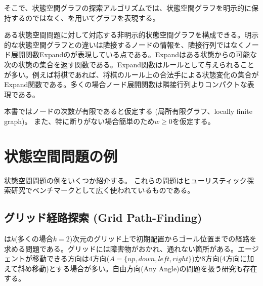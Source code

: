 そこで、状態空間グラフの探索アルゴリズムでは、状態空間グラフを明示的に保持するのではなく、を用いてグラフを表現する。


ある状態空間問題に対して対応する非明示的状態空間グラフを構成できる。明示的な状態空間グラフとの違いは隣接するノードの情報を、隣接行列ではなくノード展開関数Expandのが表現している点である。Expandはある状態からの可能な次の状態の集合を返す関数である。Expand関数はルールとして与えられることが多い。例えば将棋であれば、将棋のルール上の合法手による状態変化の集合がExpand関数である。多くの場合ノード展開関数は隣接行列よりコンパクトな表現である。

本書ではノードの次数が有限であると仮定する (局所有限グラフ、locally finite graph)。%
また、特に断りがない場合簡単のため$w \geq 0$を仮定する。




\section{状態空間問題の例}
\label{sec:search-problem}

状態空間問題の例をいくつか紹介する。
これらの問題はヒューリスティック探索研究でベンチマークとして広く使われているものである。



\subsection{グリッド経路探索 (Grid Path-Finding)}

は$k$(多くの場合$k=2$)次元のグリッド上で初期配置からゴール位置までの経路を求める問題である\cite{yap2002grid}。グリッドには障害物がおかれ、通れない箇所がある。エージェントが移動できる方向は4方向($A= \{up, down, left, right\}$)か8方向(4方向に加えて斜め移動)とする場合が多い。自由方向(Any Angle)の問題を扱う研究も存在する\cite{nash2007theta}。

